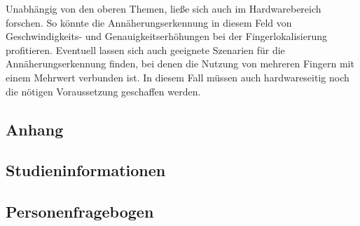 \documentclass[12pt,numbers=noenddot,parskip,bibliography=totocnumbered,listof=totocnumbered]{scrreprt}
\begin{document}
Unabhängig von den oberen Themen, ließe sich auch im Hardwarebereich forschen. So könnte die Annäherungserkennung in diesem Feld von Geschwindigkeits- und Genauigkeitserhöhungen bei der Fingerlokalisierung profitieren. Eventuell lassen sich auch geeignete Szenarien für die Annäherungserkennung finden, bei denen die Nutzung von mehreren Fingern mit einem Mehrwert verbunden ist. In diesem Fall müssen auch hardwareseitig noch die nötigen Voraussetzung geschaffen werden.

\begin{appendix} 
\chapter{Anhang}
\newpage
\section{Studieninformationen}
\vspace*{\fill}
\label{lab:Studieninformationen}
\vspace*{\fill}

\section{Personenfragebogen}
\vspace*{\fill}
\label{lab:Personenfragebogen}
\vspace*{\fill}
\clearpage
\vspace*{\fill}
\vspace*{\fill}
 

\end{appendix}
\end{document}
